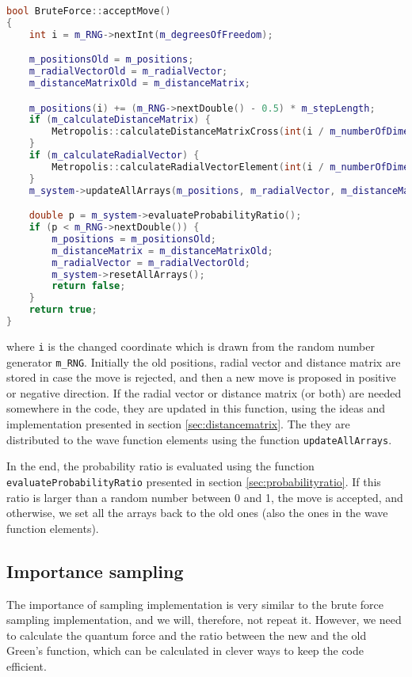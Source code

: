 \begin{lstlisting}[language=c++]
bool BruteForce::acceptMove()
{
	int i = m_RNG->nextInt(m_degreesOfFreedom);

	m_positionsOld = m_positions;
	m_radialVectorOld = m_radialVector;
	m_distanceMatrixOld = m_distanceMatrix;

	m_positions(i) += (m_RNG->nextDouble() - 0.5) * m_stepLength;
	if (m_calculateDistanceMatrix) {
		Metropolis::calculateDistanceMatrixCross(int(i / m_numberOfDimensions));
	}
	if (m_calculateRadialVector) {
		Metropolis::calculateRadialVectorElement(int(i / m_numberOfDimensions));
	}
	m_system->updateAllArrays(m_positions, m_radialVector, m_distanceMatrix, i);

	double p = m_system->evaluateProbabilityRatio();
	if (p < m_RNG->nextDouble()) {
		m_positions = m_positionsOld;
		m_distanceMatrix = m_distanceMatrixOld;
		m_radialVector = m_radialVectorOld;
		m_system->resetAllArrays();
		return false;
	}
	return true;
}
\end{lstlisting}
where \lstinline|i| is the changed coordinate which is drawn from the random number generator \lstinline|m_RNG|. Initially the old positions, radial vector and distance matrix are stored in case the move is rejected, and then a new move is proposed in positive or negative direction. If the radial vector or distance matrix (or both) are needed somewhere in the code, they are updated in this function, using the ideas and implementation presented in section \ref{sec:distancematrix}. The they are distributed to the wave function elements using the function \lstinline|updateAllArrays|.

In the end, the probability ratio is evaluated using the function \lstinline|evaluateProbabilityRatio| presented in section \ref{sec:probabilityratio}. If this ratio is larger than a random number between 0 and 1, the move is accepted, and otherwise, we set all the arrays back to the old ones (also the ones in the wave function elements). 

\subsection{Importance sampling}
The importance of sampling implementation is very similar to the brute force sampling implementation, and we will, therefore, not repeat it. However, we need to calculate the quantum force and the ratio between the new and the old Green's function, which can be calculated in clever ways to keep the code efficient. 

